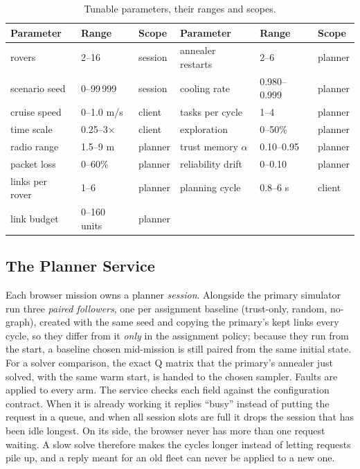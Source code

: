 \begin{table}[htbp]
\centering
\caption{Tunable parameters, their ranges and scopes.}
\label{tab:eng:params}
\footnotesize
\begin{tabular}{@{}l l l | l l l@{}}
\toprule
Parameter & Range & Scope & Parameter & Range & Scope \\
\midrule
rovers & 2--16 & session & annealer restarts & 2--6 & planner \\
scenario seed & 0--99\,999 & session & cooling rate & 0.980--0.999 & planner \\
cruise speed & 0--1.0 m/s & client & tasks per cycle & 1--4 & planner \\
time scale & 0.25--3$\times$ & client & exploration & 0--50\% & planner \\
radio range & 1.5--9 m & planner & trust memory $\alpha$ & 0.10--0.95 & planner \\
packet loss & 0--60\% & planner & reliability drift & 0--0.10 & planner \\
links per rover & 1--6 & planner & planning cycle & 0.8--6 s & client \\
link budget & 0--160 units & planner & & & \\
\bottomrule
\end{tabular}
\end{table}

\subsection{The Planner Service}

Each browser mission owns a planner \emph{session}. Alongside the primary
simulator run three \emph{paired followers}, one per assignment baseline
(trust-only, random, no-graph), created with the same seed and copying the
primary's kept links every cycle, so they differ from it \emph{only} in the
assignment policy; because they run from the start, a baseline chosen
mid-mission is still paired from the same initial state. For a solver
comparison, the exact Q matrix that the primary's annealer just solved, with
the same warm start, is handed to the chosen sampler. Faults are applied to
every arm. The service checks each field against the configuration contract.
When it is already working it replies ``busy'' instead of putting the request
in a queue, and when all session slots are full it drops the session that has
been idle longest. On its side, the browser never has more than one request
waiting. A slow solve therefore makes the cycles longer instead of letting
requests pile up, and a reply meant for an old fleet can never be applied to a
new one.

